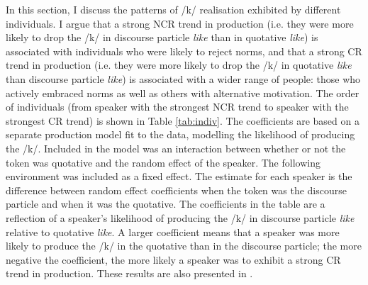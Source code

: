 In this section, I discuss the patterns of /k/ realisation exhibited by different individuals.  I argue that a strong NCR trend in production (i.e. they were more likely to drop the /k/ in discourse particle \textit{like} than in quotative \textit{like}) is associated with individuals who were likely to reject norms, and that a strong CR trend in production (i.e. they were more likely to drop the /k/ in quotative \textit{like} than discourse particle \textit{like}) is associated with a wider range of people: those who actively embraced norms as well as others with alternative motivation.  The order of individuals (from speaker with the strongest NCR trend to speaker with the strongest CR trend) is shown in Table \ref{tab:indiv}.  The coefficients are based on a separate production model fit to the data, modelling the likelihood of producing the /k/.  Included in the model was an interaction between whether or not the token was quotative and the random effect of the speaker.  The following environment was included as a fixed effect.  The estimate for each speaker is the difference between random effect coefficients when the token was the discourse particle and when it was the quotative.  The coefficients in the table are a reflection of a speaker's likelihood of producing the /k/ in discourse particle \textit{like} relative to quotative \textit{like}.  A larger coefficient means that a speaker was more likely to produce the /k/ in the quotative than in the discourse particle; the more negative the coefficient, the more likely a speaker was to exhibit a strong CR trend in production.  These results are also presented in .



